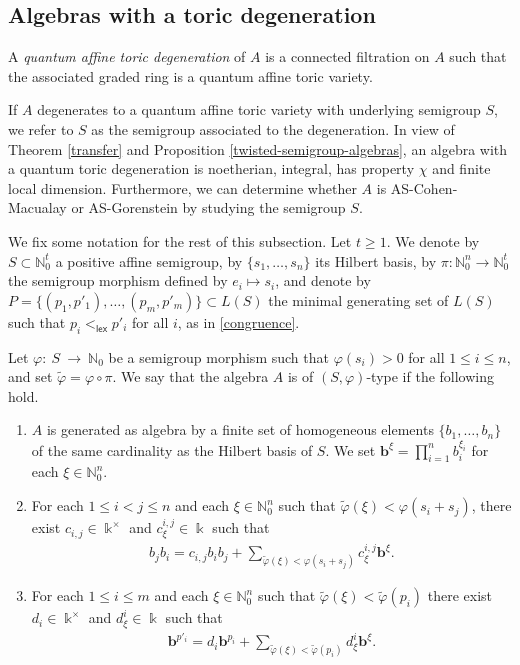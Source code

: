 \documentclass[11pt,fleqn]{article}
\newcommand\NN{\mathbb N}
\renewcommand\to{\longrightarrow}
\renewcommand\phi{\varphi}
\newcommand\tphi{\tilde \phi}
\renewcommand\b{\mathbf b}
\renewcommand\k{\Bbbk}
\newcommand\lex{\mathsf{lex}}
\begin{document}
\subsection*{Algebras with a toric degeneration}

\begin{Definition}
A \emph{quantum affine toric degeneration} of $A$ is a connected filtration on $A$ such 
that the associated graded ring is a quantum affine toric variety. 
\end{Definition}
If $A$ degenerates to a quantum affine toric variety with underlying semigroup $S$, we 
refer to $S$ as the semigroup associated to the degeneration. In view of Theorem 
\ref{transfer} and Proposition \ref{twisted-semigroup-algebras}, an algebra with a 
quantum toric degeneration is noetherian, integral, has property $\chi$ and finite local 
dimension. Furthermore, we can determine whether $A$ is AS-Cohen-Macualay or 
AS-Gorenstein by studying the semigroup $S$.

We fix some notation for the rest of this subsection. Let $t \geq 1$. We denote by $S 
\subset \NN_0^t$ a positive affine semigroup, by $\{s_1, \ldots, s_n\}$ its 
Hilbert basis, by $\pi: \NN_0^n \to \NN_0^t$ the semigroup morphism defined by 
$e_i \longmapsto s_i$, and denote by $P = \{(p_1, p'_1), \ldots, (p_m, p'_m)\} 
\subset L(S)$ the minimal generating set of $L(S)$ such that $p_i <_{\lex} p'_i$ for all
$i$, as in \ref{congruence}.

\begin{Definition}
\label{s-phi-type}
Let $\phi:~S~\to~\NN_0$ be a semigroup morphism such that $\phi(s_i) > 0$ for all $1 
\leq i \leq n$, and set $\tphi = \phi \circ \pi$.  We say that the algebra $A$ is of 
$(S, \phi)$-type if the following hold. 
\begin{enumerate}
\item \label{generation}
$A$ is generated as algebra by a finite set of homogeneous elements $\{b_1, 
\ldots, b_n\}$ of the same cardinality as the Hilbert basis of $S$. We set
$\b^\xi = \displaystyle \prod_{i = 1}^n b_i^{\xi_i}$ for each $\xi \in \NN_0^n$.

\item \label{commutation}
For each $1 \leq i < j \leq n$ and each $\xi \in \NN_0^n$ such that $\tphi(\xi) < 
\phi(s_i + s_j)$, there exist $c_{i,j} \in \k^\times$ and $c^{i,j}_\xi \in \k$ such that
\begin{align*}
  b_j b_i = c_{i,j} b_i b_j + \sum_{\tphi(\xi) < \phi(s_i + s_j)} c^{i,j}_\xi
    \b^\xi.
\end{align*}

\item \label{straightening}
For each $1 \leq i \leq m$ and each $\xi \in \NN_0^n$ such that $\tphi(\xi) <
\tphi(p_i)$ there exist $d_i \in \k^\times$ and $d^i_\xi \in \k$ such that
    \begin{align*}
      \b^{p'_i} = d_i \b^{p_i} + \sum_{\tphi(\xi) < \tphi(p_i)} d^i_\xi \b^\xi.
    \end{align*}
\end{enumerate}
\end{Definition}
\end{document}
